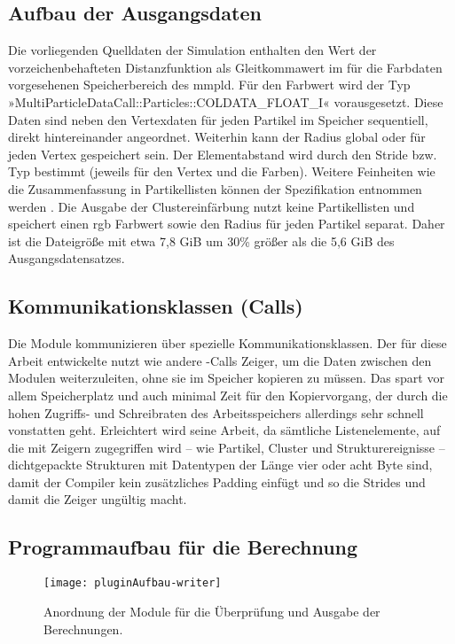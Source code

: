 \subsection*{Aufbau der Ausgangsdaten}\label{sec:pluginaufbau-mmpld}
Die vorliegenden Quelldaten der Simulation enthalten den Wert der vorzeichenbehafteten Distanzfunktion als Gleitkommawert im für die Farbdaten vorgesehenen Speicherbereich des \gls{mmpld}. Für den Farbwert wird der Typ »MultiParticleDataCall::Particles::COLDATA\_FLOAT\_I« vorausgesetzt. Diese Daten sind neben den Vertexdaten für jeden Partikel im Speicher sequentiell, direkt hintereinander angeordnet. Weiterhin kann der Radius global oder für jeden Vertex gespeichert sein. Der Elementabstand wird durch den Stride bzw. Typ bestimmt (jeweils für den Vertex und die Farben). Weitere Feinheiten wie die Zusammenfassung in Partikellisten können der Spezifikation entnommen werden \cite[S.~3]{FileFormatSpecificationMMPLD}. Die Ausgabe der Clustereinfärbung nutzt keine Partikellisten und speichert einen \gls{rgb} Farbwert sowie den Radius für jeden Partikel separat. Daher ist die Dateigröße mit etwa 7,8 \gls{GiB} um 30\% größer als die 5,6 \gls{GiB} des Ausgangsdatensatzes.

\subsection*{Kommunikationsklassen (Calls)}
Die Module kommunizieren über spezielle Kommunikationsklassen. Der für diese Arbeit entwickelte  nutzt wie andere -Calls Zeiger, um die Daten zwischen den Modulen weiterzuleiten, ohne sie im Speicher kopieren zu müssen. Das spart vor allem Speicherplatz und auch minimal Zeit für den Kopiervorgang, der durch die hohen Zugriffs- und Schreibraten des Arbeitsspeichers allerdings sehr schnell vonstatten geht. Erleichtert wird seine Arbeit, da sämtliche Listenelemente, auf die mit Zeigern zugegriffen wird -- wie Partikel, Cluster und Strukturereignisse -- dichtgepackte Strukturen mit Datentypen der Länge vier oder acht Byte sind, damit der Compiler kein zusätzliches Padding einfügt und so die Strides und damit die Zeiger ungültig macht.

\subsection*{Programmaufbau für die Berechnung}\label{sec:pluginaufbau-calc}
\begin{figure}
	\texttt{[image: pluginAufbau-writer]}
	\caption{Anordnung der  Module für die Überprüfung und Ausgabe der Berechnungen.}\label{fig:pluginAufbau-writer}
\end{figure}

